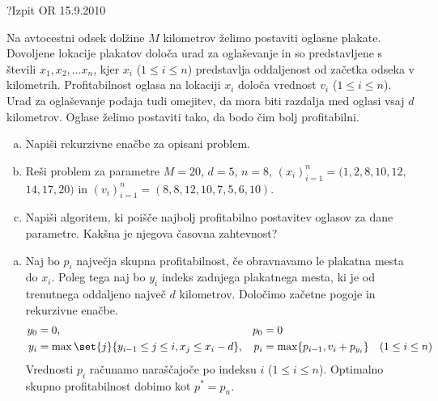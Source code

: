 \begin{naloga}{?}{Izpit OR 15.9.2010}
\begin{vprasanje}
Na avtocestni odsek dolžine $M$ kilometrov
želimo postaviti oglasne plakate.
Dovoljene lokacije plakatov določa urad za oglaševanje
in so predstavljene s števili $x_1, x_2, \dots x_n$,
kjer $x_i$ ($1 \le i \le n$)
predstavlja oddaljenost od začetka odseka v kilometrih.
Profitabilnost oglasa na lokaciji $x_i$ določa vrednost $v_i$
($1 \le i \le n$).
Urad za oglaševanje podaja tudi omejitev,
da mora biti razdalja med oglasi vsaj $d$ kilometrov.
Oglase želimo postaviti tako, da bodo čim bolj profitabilni.
\begin{enumerate}[(a)]
\item Napiši rekurzivne enačbe za opisani problem.
\item Reši problem za parametre $M = 20$, $d = 5$, $n = 8$,
$(x_i)_{i=1}^n = (1, 2, 8, 10, 12,$ $14, 17, 20)$ in
$(v_i)_{i=1}^n = (8, 8, 12, 10, 7, 5, 6, 10)$.
\item Napiši algoritem,
ki poišče najbolj profitabilno postavitev oglasov za dane parametre.
Kakšna je njegova časovna zahtevnost?
\end{enumerate}
\end{vprasanje}

\begin{odgovor}
\begin{enumerate}[(a)]
\item Naj bo $p_i$ največja skupna profitabilnost,
če obravnavamo le plakatna mesta do $x_i$.
Poleg tega naj bo $y_i$ indeks zadnjega plakatnega mesta,
ki je od tre\-nut\-ne\-ga oddaljeno največ $d$ kilometrov.
Določimo začetne pogoje in rekurzivne enačbe.
\begin{align*}
y_0 &= 0, & p_0 &= 0 \\
y_i &= \max\set{j}{y_{i-1} \le j \le i, x_j \le x_i - d},
& p_i &= \max\{p_{i-1}, v_i + p_{y_i}\} \quad (1 \le i \le n)
\end{align*}
Vrednosti $p_i$ računamo naraščajoče po indeksu $i$ ($1 \le i \le n$).
Optimalno skupno profitabilnost dobimo kot $p^* = p_n$.


\end{enumerate}
\end{odgovor}
\end{naloga}
